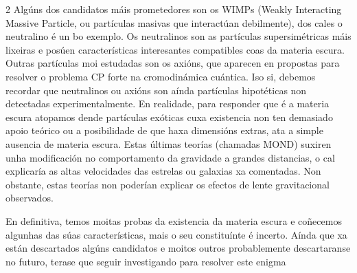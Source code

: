 \begin{refsection}
\begin{multicols}{2}
Algúns dos candidatos máis prometedores son os WIMPs (Weakly Interacting
Massive Particle, ou partículas masivas que interactúan debilmente), dos cales
o neutralino é un bo exemplo. Os neutralinos son as partículas supersimétricas
máis lixeiras e posúen características interesantes compatibles coas da materia
escura. Outras partículas moi estudadas son os axións, que aparecen en
propostas para resolver o problema CP forte na cromodinámica cuántica. Iso si,
debemos recordar que neutralinos ou axións son aínda partículas hipotéticas non
detectadas experimentalmente. En realidade, para responder que é a materia
escura atopamos dende partículas exóticas cuxa existencia non ten demasiado
apoio teórico ou a posibilidade de que haxa dimensións extras, ata a simple
ausencia de materia escura. Estas últimas teorías (chamadas MOND) suxiren unha
modificación no comportamento da gravidade a grandes distancias, o cal
explicaría as altas velocidades das estrelas ou galaxias xa comentadas. Non
obstante, estas teorías non poderían explicar os efectos de lente gravitacional
observados.

En definitiva, temos moitas probas da existencia da materia escura e coñecemos
algunhas das súas características, mais o seu constituínte é incerto. Aínda que
xa están descartados algúns candidatos e moitos outros probablemente
descartaranse no futuro, terase que seguir investigando para resolver este
enigma


\nocite{alberto2021materiaescura}
\nocite{krauss5esencia}
\nocite{hubbleNASA}
\nocite{hubbleNASA2}

\printbibliography

\end{multicols}
\end{refsection}
